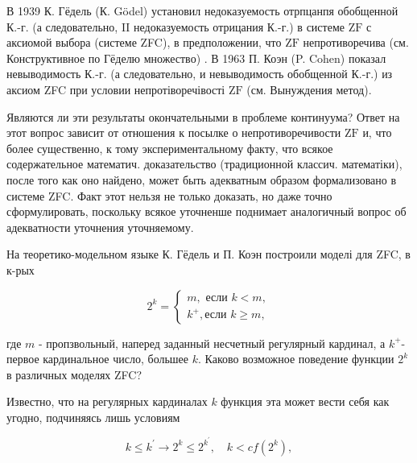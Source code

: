 \documentclass[10pt]{article}
\begin{document}
В 1939 К. Гёдель (К. Gödel) установил недоказуемость отрпцанпя обобщенной К.-г. (а следовательно, II недоказуемость отрицания К.-г.) в системе $\mathrm{ZF}$ с аксиомой выбора (системе ZFC), в предположении, что $\mathrm{ZF}$ непротиворечива (см. Конструктивное по Гёделю множество) . В 1963 П. Коэн (P. Cohen) показал невыводимость К.-г. (а следовательно, и невыводимость обобщенной К.-г.) из аксиом ZFC при условии непротіворечівості $\mathrm{ZF}$ (см. Вынуждения метод).



Являются ли эти результаты окончательными в проблеме континуума? Ответ на этот вопрос зависит от отношения к посылке о непротиворечивости $\mathrm{ZF}$ и, что более существенно, к тому экспериментальному факту, что всякое содержательное математич. доказательство (традиционной классич. математіки), после того как оно найдено, может быть адекватным образом формализовано в системе ZFC. Факт этот нельзя не только доказать, но даже точно сформулировать, поскольку всякое уточненше поднимает аналогичный вопрос об адекватности уточнения уточняемому.



На теоретико-модельном языке К. Гёдель и П. Коэн построили моделі для ZFC, в к-рых



\[

2^{k}=\left\{\begin{array}{l}

m, \text { если } k<m, \\

k^{+}, \text {если } k \geqslant m,

\end{array}\right.

\]



где $m$ - пропзвольный, наперед заданный несчетный регулярный кардинал, а $k^{+}$- первое кардинальное число, большее $k$. Каково возможное поведение функции $2^{k}$ в различных моделях ZFC?



Известно, что на регулярных кардиналах $k$ функция эта может вести себя как угодно, подчиняясь лишь условиям



\[

k \leqslant k^{\prime} \longrightarrow 2^{k} \leqslant 2^{k^{\prime}}, \quad k<c f\left(2^{k}\right),

\]
\end{document}
